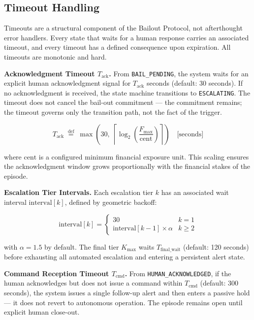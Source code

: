 \bigskip

\subsection{Timeout Handling}

Timeouts are a structural component of the Bailout Protocol, not afterthought error handlers. Every state that waits for a human response carries an associated timeout, and every timeout has a defined consequence upon expiration. All timeouts are monotonic and hard.

\bigskip

\noindent\textbf{Acknowledgment Timeout $T_{\text{ack}}$.} From \texttt{BAIL\_PENDING}, the system waits for an explicit human acknowledgment signal for $T_{\text{ack}}$ seconds (default: 30 seconds). If no acknowledgment is received, the state machine transitions to \texttt{ESCALATING}. The timeout does not cancel the bail-out commitment — the commitment remains; the timeout governs only the transition path, not the fact of the trigger.

\[
T_{\text{ack}} \; \overset{\text{def}}{=} \; \max\left(30,\; \left\lceil \log_2\left(\frac{F_{\text{max}}}{\text{cent}}\right)\right\rceil \right) \quad \text{[seconds]}
\]

where $\text{cent}$ is a configured minimum financial exposure unit. This scaling ensures the acknowledgment window grows proportionally with the financial stakes of the episode.

\bigskip

\noindent\textbf{Escalation Tier Intervals.} Each escalation tier $k$ has an associated wait interval $\text{interval}[k]$, defined by geometric backoff:

\[
\text{interval}[k] = \begin{cases}
30 & k = 1 \\
\text{interval}[k-1] \times \alpha & k \geq 2
\end{cases}
\]

with $\alpha = 1.5$ by default. The final tier $K_{\text{max}}$ waits $T_{\text{final\_wait}}$ (default: 120 seconds) before exhausting all automated escalation and entering a persistent alert state.

\bigskip

\noindent\textbf{Command Reception Timeout $T_{\text{cmd}}$.} From \texttt{HUMAN\_ACKNOWLEDGED}, if the human acknowledges but does not issue a command within $T_{\text{cmd}}$ (default: 300 seconds), the system issues a single follow-up alert and then enters a passive hold — it does not revert to autonomous operation. The episode remains open until explicit human close-out.

